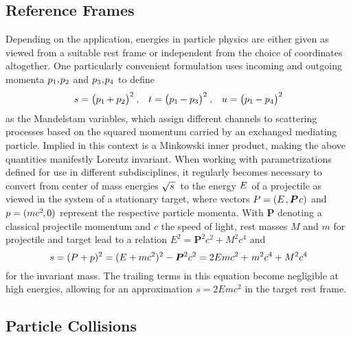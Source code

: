 \begin{spacing}{0.985}
	\subsection{Reference Frames}
	\label{sub:frames}

	Depending on the application, energies in particle physics are either given as viewed from a suitable rest frame or independent from
	the choice of coordinates altogether. One particularly convenient formulation uses incoming and outgoing momenta
	$p_1 , \kern-1.0pt p_2$ and $p_3 \kern+0.5pt , \kern-1.0pt p_4$ to define
	\begin{align*}
		s = \bigl( p_1 \kern-0.5pt + p_2 \bigr)^2 \: , &&
		t = \bigl( p_1 \kern-0.5pt - p_3 \bigr)^2 \: , &&
		u = \bigl( p_1 \kern-0.5pt - p_4 \bigr)^2
	\end{align*}
	as the Mandelstam variables, which assign different channels to scattering processes based on the squared momentum carried by an
	exchanged mediating particle. Implied in this context is a Minkowski inner product, making the above quantities manifestly Lorentz
	invariant. When working with parametrizations defined for use in different subdisciplines, it regularly becomes necessary to convert
	from center of mass energies $\sqrt{s \kern+1.0pt} \kern+1.0pt$ to the energy $\kern-0.5pt E \kern+1.0pt$ of a projectile as viewed
	in the system of a stationary target, where vectors $P = (E \kern+1.0pt , \bm{P} \kern+0.75pt c)$ and $p = (m c^2 \kern-1.0pt , 0)$
	represent the respective particle momenta. With $\bm{P}$ denoting a classical projectile momentum and $c$ the speed of light,
	rest masses $M$ and $m$ for projectile and target lead to a relation $E^2 = \bm{P}^2 c^2 + M^2 c^4$ and
	\begin{equation*}
		s = (P + p)^2 = (E + m c^2)^2 - \bm{P}^2 c^2 = 2E m c^2 + \kern+1.0pt m^2 c^4 + M^2 c^4
	\end{equation*}
	for the invariant mass. The trailing terms in this equation become negligible at high energies, allowing for an approximation
	$s = 2E m c^2$ in the target rest frame.



	\subsection{Particle Collisions}
	\label{sub:collisions}


\end{spacing}
